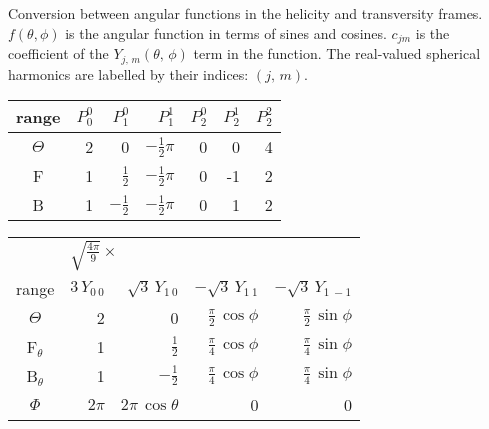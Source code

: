 \begin{table}[p]
  \caption{Conversion between angular functions in the helicity and transversity frames.
    $f(\theta, \phi)$ is the angular function in terms of sines and cosines. $c_{jm}$ is the
    coefficient of the $Y_{j,\,m}(\theta,\,\phi)$ term in the function. The real-valued spherical
    harmonics are labelled by their indices: $(j,\,m)$.}
  \label{tab:helTransConv}
\end{table}

\begin{table}[p]
  \centering
  \begin{tabular}{| c || r | r | r | r | r | r |}
    \hline
    range  &  $P_0^0$  &  $P_1^0$  &  $P_1^1$  &  $P_2^0$  &  $P_2^1$  &  $P_2^2$  \\
    \hline\hline

    $\Theta$  &  2  &  0  &  $-\frac{1}{2}\pi$  &  0  &  0  &  4  \\
    \hline
    F  &  1  &  $\frac{1}{2}$  &  $-\frac{1}{2}\pi$  &  0  &  -1  &  2  \\
    \hline
    B  &  1  &  $-\frac{1}{2}$  &  $-\frac{1}{2}\pi$  &  0  &  1  &  2  \\
    \hline
  \end{tabular}

  \vspace{10pt}

  \begin{tabular}{| c || r | r | r | r |}
    \hline
    &  \multicolumn{4}{l|}{$\sqrt{\frac{4\pi}{9}}\times$}  \\
    range  &  $3\,Y_{0\:0}$
           &  $\sqrt{3}\,Y_{1\:0}$
           &  $-\sqrt{3}\,Y_{1\:1}$
           &  $-\sqrt{3}\,Y_{1\:-1}$  \\
    \hline\hline

    $\Theta$  &  2
              &  0  &  $\frac{\pi}{2}\, \cos\phi$  &  $\frac{\pi}{2}\, \sin\phi$  \\
    \hline

    F$_\theta$  &  1
                &  $\frac{1}{2}$  &  $\frac{\pi}{4}\, \cos\phi$  &  $\frac{\pi}{4}\, \sin\phi$  \\
    \hline

    B$_\theta$  &  1
                &  $-\frac{1}{2}$  &  $\frac{\pi}{4}\, \cos\phi$  &  $\frac{\pi}{4}\, \sin\phi$  \\
    \hline\hline

    $\Phi$  &  $2\pi$
            &  $2\pi\, \cos\theta$  &  0  &  0  \\
    \hline


\end{tabular}
\end{table}
